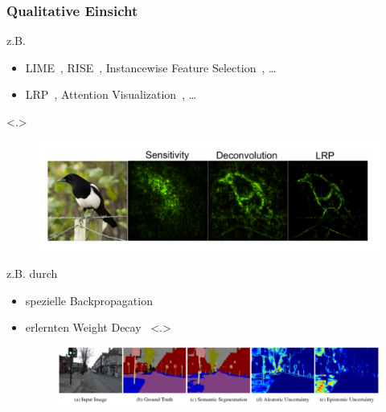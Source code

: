 \begin{frame}[t]\frametitle{Qualitative Einsicht}
  \begin{description}[<only@+->][]
  \item[Heatmapping] z.B.
    \begin{itemize}[<.->]
    \item LIME~\cite{ribeiro_why_2016},
      RISE~\cite{petsiuk_rise:_2018},
      Instancewise Feature Selection~\cite{chen_learning_2018},
      \dots
    \item LRP~\cite{bach_pixel-wise_2015},
      Attention Visualization~\cite{kim_interpretable_2017},
      \dots
    \end{itemize}
    \only<.>{
      \begin{figure}
        \centering
        \href{https://indico.scc.kit.edu/event/344/contributions/2434/attachments/1258/1759/Talk_Samek.pdf}%
        {\includegraphics[width=0.6\linewidth]{heatmapping}}
      \end{figure}
    }
  \item[Unsicherheitsangaben] z.B. durch
    \begin{itemize}[<.->]
    \item spezielle Backpropagation~\cite{gast_lightweight_2018}
    \item erlernten Weight Decay~\cite{kendall_what_2017}
      \only<.>{
      \begin{figure}
        \centering
        \href{http://arxiv.org/abs/1703.04977}%
        {\includegraphics[width=\linewidth]{learned_weight_decay}}%

\end{figure}}
\end{itemize}
\end{description}
\end{frame}
